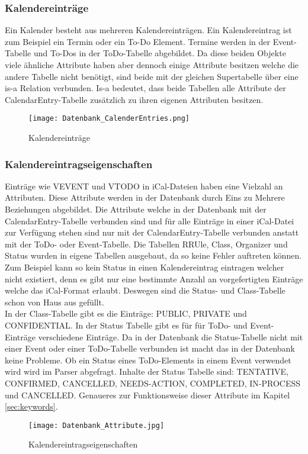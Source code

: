 \subsubsection*{Kalendereinträge}
\label{ref:kalenderEintraege}
Ein Kalender besteht aus mehreren Kalendereinträgen. Ein Kalendereintrag ist zum Beispiel ein Termin oder ein To-Do Element. Termine werden in der Event-Tabelle und To-Dos in der ToDo-Tabelle abgebildet. Da diese beiden Objekte viele ähnliche Attribute haben aber dennoch einige Attribute besitzen welche die andere Tabelle nicht benötigt, sind beide mit der gleichen Supertabelle über eine is-a Relation verbunden. Is-a bedeutet, dass beide Tabellen alle Attribute der CalendarEntry-Tabelle zusätzlich zu ihren eigenen Attributen besitzen.
\begin{figure}[H]
	\texttt{[image: Datenbank\_CalenderEntries.png]}
    \caption{Kalendereinträge}
    \label{fig:calendarEntries}
\end{figure}

\subsubsection*{Kalendereintragseigenschaften}
\label{ref:kalendereintragseigenschaften}
Einträge wie VEVENT und VTODO in iCal-Dateien haben eine Vielzahl an Attributen. Diese Attribute werden in der Datenbank durch Eins zu Mehrere Beziehungen abgebildet. Die Attribute welche in der Datenbank mit der CalendarEntry-Tabelle verbunden sind und für alle Einträge in einer iCal-Datei zur Verfügung stehen sind nur mit der CalendarEntry-Tabelle verbunden anstatt mit der ToDo- oder Event-Tabelle. Die Tabellen RRUle, Class, Organizer und Status wurden in eigene Tabellen ausgebaut, da so keine Fehler auftreten können. Zum Beispiel kann so kein Status in einen Kalendereintrag eintragen welcher nicht existiert, denn es gibt nur eine bestimmte Anzahl an vorgefertigten Einträge welche das iCal-Format erlaubt. Deswegen sind die Status- und Class-Tabelle schon von Haus aus gefüllt.\\
In der Class-Tabelle gibt es die Einträge: PUBLIC, PRIVATE und CONFIDENTIAL. In der Status Tabelle gibt es für für ToDo- und Event-Einträge verschiedene Einträge. Da in der Datenbank die Status-Tabelle nicht mit einer Event oder einer ToDo-Tabelle verbunden ist macht das in der Datenbank keine Probleme. Ob ein Status eines ToDo-Elements in einem Event verwendet wird wird im Parser abgefragt. Inhalte der Status Tabelle sind: TENTATIVE, CONFIRMED, CANCELLED, NEEDS-ACTION, COMPLETED, IN-PROCESS und CANCELLED. Genaueres zur Funktionsweise dieser Attribute im Kapitel \ref{sec:keywords}.
\begin{figure}[H]
	\texttt{[image: Datenbank\_Attribute.jpg]}
    \caption{Kalendereintragseigenschaften}
    \label{fig:kalendereintragseigenschaften}
\end{figure}

